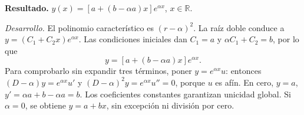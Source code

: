 \noindent\textbf{Resultado.} \(y(x)=[a+(b-\alpha a)x]e^{\alpha x}\), \(x\in\mathbb R\).

\noindent\textit{Desarrollo.} El polinomio característico es \((r-\alpha)^2\). La raíz doble conduce a \(y=(C_1+C_2x)e^{\alpha x}\).
Las condiciones iniciales dan \(C_1=a\) y \(\alpha C_1+C_2=b\), por lo que
\[y=[a+(b-\alpha a)x]e^{\alpha x}.\]
Para comprobarlo sin expandir tres términos, poner \(y=e^{\alpha x}u\): entonces
\((D-\alpha)y=e^{\alpha x}u'\) y \((D-\alpha)^2y=e^{\alpha x}u''=0\), porque \(u\) es afín.
En cero, \(y=a\), \(y'=\alpha a+b-\alpha a=b\). Los coeficientes constantes garantizan unicidad global. Si \(\alpha=0\), se obtiene \(y=a+bx\), sin excepción ni división por cero.
